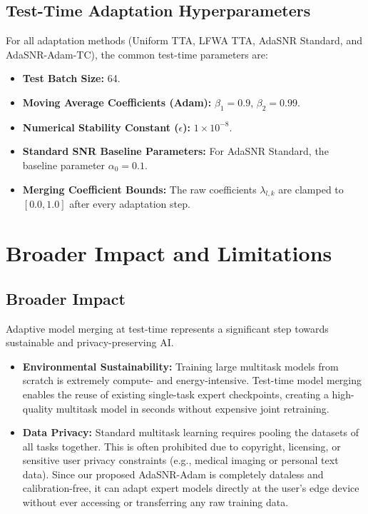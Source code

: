 \documentclass{article}
\theoremstyle{plain}
\theoremstyle{definition}
\theoremstyle{remark}
\begin{document}
\subsection{Test-Time Adaptation Hyperparameters}
For all adaptation methods (Uniform TTA, LFWA TTA, AdaSNR Standard, and AdaSNR-Adam-TC), the common test-time parameters are:
\begin{itemize}
    \item \textbf{Test Batch Size:} 64.
    \item \textbf{Moving Average Coefficients (Adam):} $\beta_1 = 0.9$, $\beta_2 = 0.99$.
    \item \textbf{Numerical Stability Constant ($\epsilon$):} $1 \times 10^{-8}$.
    \item \textbf{Standard SNR Baseline Parameters:} For AdaSNR Standard, the baseline parameter $\alpha_0 = 0.1$.
    \item \textbf{Merging Coefficient Bounds:} The raw coefficients $\lambda_{l,k}$ are clamped to $[0.0, 1.0]$ after every adaptation step.
\end{itemize}

\section{Broader Impact and Limitations}
\label{app:impact}

\subsection{Broader Impact}
Adaptive model merging at test-time represents a significant step towards sustainable and privacy-preserving AI.
\begin{itemize}
    \item \textbf{Environmental Sustainability:} Training large multitask models from scratch is extremely compute- and energy-intensive. Test-time model merging enables the reuse of existing single-task expert checkpoints, creating a high-quality multitask model in seconds without expensive joint retraining.
    \item \textbf{Data Privacy:} Standard multitask learning requires pooling the datasets of all tasks together. This is often prohibited due to copyright, licensing, or sensitive user privacy constraints (e.g., medical imaging or personal text data). Since our proposed AdaSNR-Adam is completely dataless and calibration-free, it can adapt expert models directly at the user's edge device without ever accessing or transferring any raw training data.
\end{itemize}
\end{document}
